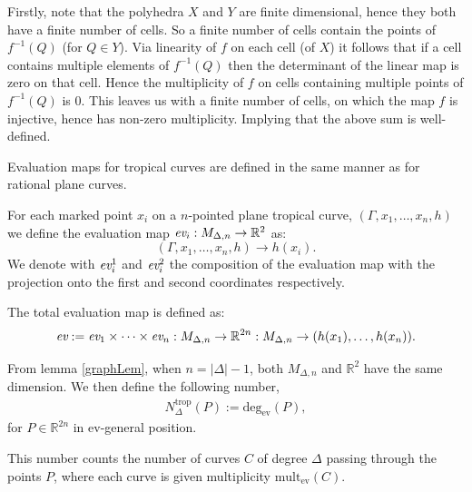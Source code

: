 \begin{remark}
    Firstly, note that the polyhedra $X$ and $Y$ are finite dimensional, hence they both have a finite number of cells. 
    So a finite number of cells contain the points of $f^{-1}(Q)$ (for $Q\in Y$).
    Via linearity of $f$ on each cell (of $X$) it follows that if a cell contains multiple elements of $f^{-1}(Q)$ then the determinant of the linear map is zero on that cell. 
    Hence the multiplicity of $f$ on cells containing multiple points of $f^{-1}(Q)$ is $0$.
    This leaves us with a finite number of cells, on which the map $f$ is injective, hence has non-zero multiplicity. 
    Implying that the above sum is well-defined.
\end{remark}

Evaluation maps for tropical curves are defined in the same manner as for rational plane curves.
\begin{definition}
    For each marked point $x_{i}$ on a $n$-pointed plane tropical curve, $(\Gamma,x_{1},\dots,x_{n},h)$ we define the evaluation map $\emph{ev}_{i}:M_{\Delta, n} \to \mathbb{R}^{2}$ as:
    \[
        (\Gamma,x_{1},\dots,x_{n},h) \to h(x_{i}).
    \]
    We denote with $\emph{ev}_{i}^{1}$ and $\emph{ev}_{i}^{2}$ the composition of the evaluation map with the projection onto the first and second coordinates respectively.
    \par The total evaluation map is defined as:
    \[
        \emph{ev} := \emph{ev}_{1} \times \dots \times \emph{ev}_{n}:M_{\Delta, n} \to \mathbb{R}^{2n}: M_{\Delta, n} \to (h(x_{1}),\dots,h(x_{n})).
    \]
\end{definition}

\begin{remark}
    
\end{remark}

\begin{remark}
    From lemma \ref{graphLem}, when $n = |\Delta|-1$, both $M_{\Delta, n}$ and $\mathbb{R}^{2}$ have the same dimension. We then define the following number,
    \begin{align*}
        N^{\text{trop}}_{\Delta}(P) := \text{deg}_{\text{ev}}(P),
    \end{align*}
    for $P \in \mathbb{R}^{2n}$ in $\text{ev}$-general position.
    \par This number counts the number of curves $C$ of degree $\Delta$ passing through the points $P$, where each curve is given multiplicity $\text{mult}_{\text{ev}}(C)$.
\end{remark}

